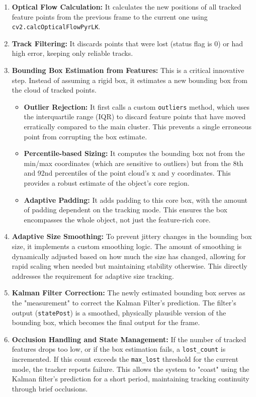 \documentclass[12pt, a4paper]{article}
\begin{document}
\begin{enumerate}
    \item \textbf{Optical Flow Calculation:} It calculates the new positions of all tracked feature points from the previous frame to the current one using \texttt{cv2.calcOpticalFlowPyrLK}.
    \item \textbf{Track Filtering:} It discards points that were lost (status flag is 0) or had high error, keeping only reliable tracks.
    \item \textbf{Bounding Box Estimation from Features:} This is a critical innovative step. Instead of assuming a rigid box, it estimates a new bounding box from the cloud of tracked points.
    \begin{itemize}
        \item \textbf{Outlier Rejection:} It first calls a custom \texttt{outliers} method, which uses the interquartile range (IQR) to discard feature points that have moved erratically compared to the main cluster. This prevents a single erroneous point from corrupting the box estimate.
        \item \textbf{Percentile-based Sizing:} It computes the bounding box not from the min/max coordinates (which are sensitive to outliers) but from the 8th and 92nd percentiles of the point cloud's x and y coordinates. This provides a robust estimate of the object's core region.
        \item \textbf{Adaptive Padding:} It adds padding to this core box, with the amount of padding dependent on the tracking mode. This ensures the box encompasses the whole object, not just the feature-rich core.
    \end{itemize}
    \item \textbf{Adaptive Size Smoothing:} To prevent jittery changes in the bounding box size, it implements a custom smoothing logic. The amount of smoothing is dynamically adjusted based on how much the size has changed, allowing for rapid scaling when needed but maintaining stability otherwise. This directly addresses the requirement for adaptive size tracking.
    \item \textbf{Kalman Filter Correction:} The newly estimated bounding box serves as the "measurement" to correct the Kalman Filter's prediction. The filter's output (\texttt{statePost}) is a smoothed, physically plausible version of the bounding box, which becomes the final output for the frame.
    \item \textbf{Occlusion Handling and State Management:} If the number of tracked features drops too low, or if the box estimation fails, a \texttt{lost\_count} is incremented. If this count exceeds the \texttt{max\_lost} threshold for the current mode, the tracker reports failure. This allows the system to "coast" using the Kalman filter's prediction for a short period, maintaining tracking continuity through brief occlusions.

\end{enumerate}
\end{document}
